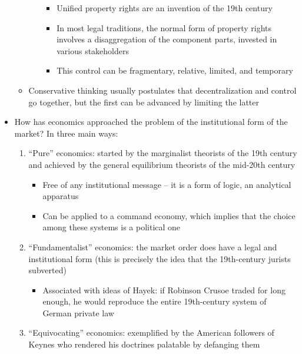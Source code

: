 \begin{itemize}
\begin{itemize}
\begin{enumerate}
      \begin{itemize}
      \tightlist
      \item
        Unified property rights are an invention of the 19th century
      \item
        In most legal traditions, the normal form of property rights
        involves a disaggregation of the component parts, invested in
        various stakeholders
      \item
        This control can be fragmentary, relative, limited, and
        temporary
      \end{itemize}
    \end{enumerate}
  \item
    Conservative thinking usually postulates that decentralization and
    control go together, but the first can be advanced by limiting the
    latter
  \end{itemize}
\item
  How has economics approached the problem of the institutional form of
  the market? In three main ways:

  \begin{enumerate}
  \def\labelenumi{\arabic{enumi}.}
  \tightlist
  \item
    ``Pure'' economics: started by the marginalist theorists of the 19th
    century and achieved by the general equilibrium theorists of the
    mid-20th century

    \begin{itemize}
    \tightlist
    \item
      Free of any institutional message -- it is a form of logic, an
      analytical apparatus
    \item
      Can be applied to a command economy, which implies that the choice
      among these systems is a political one
    \end{itemize}
  \item
    ``Fundamentalist'' economics: the market order does have a legal and
    institutional form (this is precisely the idea that the 19th-century
    jurists subverted)

    \begin{itemize}
    \tightlist
    \item
      Associated with ideas of Hayek: if Robinson Crusoe traded for long
      enough, he would reproduce the entire 19th-century system of
      German private law
    \end{itemize}
  \item
    ``Equivocating'' economics: exemplified by the American followers of
    Keynes who rendered his doctrines palatable by defanging them


\end{enumerate}
\end{itemize}
